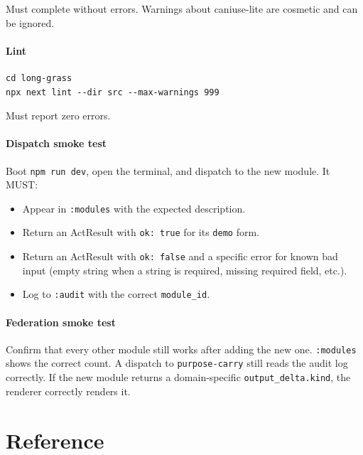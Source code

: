 \documentclass[11pt,a4paper]{article}
\theoremstyle{contract}
\begin{document}
Must complete without errors. Warnings about caniuse-lite are cosmetic
and can be ignored.

\subsection{Lint}

\begin{lstlisting}[style=shell]
cd long-grass
npx next lint --dir src --max-warnings 999
\end{lstlisting}

Must report zero errors.

\subsection{Dispatch smoke test}

Boot \texttt{npm run dev}, open the terminal, and dispatch to the new
module. It MUST:

\begin{itemize}[nosep,leftmargin=1.4em]
\item Appear in \texttt{:modules} with the expected description.
\item Return an ActResult with \texttt{ok: true} for its \texttt{demo}
form.
\item Return an ActResult with \texttt{ok: false} and a specific error
for known bad input (empty string when a string is required, missing
required field, etc.).
\item Log to \texttt{:audit} with the correct \texttt{module\_id}.
\end{itemize}

\subsection{Federation smoke test}

Confirm that every other module still works after adding the new one.
\texttt{:modules} shows the correct count. A dispatch to
\texttt{purpose-carry} still reads the audit log correctly. If the new
module returns a domain-specific \texttt{output\_delta.kind}, the
renderer correctly renders it.

\part{Reference}
\end{document}
